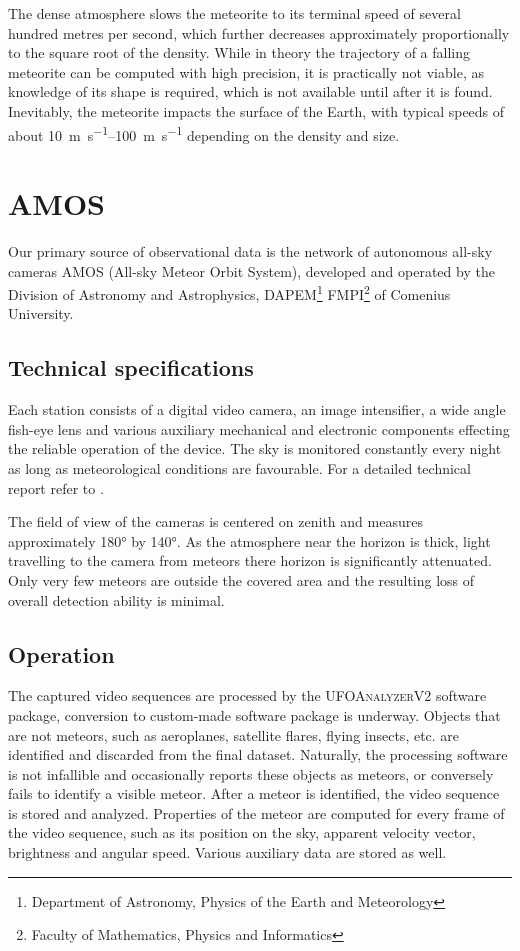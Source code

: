         The dense atmosphere slows the meteorite to its terminal speed of several hundred metres per second,
        which further decreases approximately proportionally to the square root of the density.
        While in theory the trajectory of a falling meteorite can be computed with high precision,
        it is practically not viable, as knowledge of its shape is required, which is not available
        until after it is found.
        Inevitably, the meteorite impacts the surface of the Earth,
        with typical speeds of about \SIrange{10}{100}{\metre\per\second} depending on the density and size.

\section{AMOS} \label{iA}
    Our primary source of observational data is the network of autonomous all-sky cameras AMOS (All-sky Meteor Orbit System),
    developed and operated by the Division of Astronomy and Astrophysics,
    DAPEM\footnote{Department of Astronomy, Physics of the Earth and Meteorology}
    FMPI\footnote{Faculty of Mathematics, Physics and Informatics} of Comenius University.

    \subsection{Technical specifications} \label{iAt}
        Each station consists of a digital video camera, an image intensifier, a wide angle fish-eye lens
        and various auxiliary mechanical and electronic components effecting
        the reliable operation of the device. The sky is monitored constantly every night
        as long as meteorological conditions are favourable. For a detailed technical report refer to \citet{zigo+2013,toth+2015}.

        The field of view of the cameras is centered on zenith and measures approximately \ang{180} by \ang{140}.
        As the atmosphere near the horizon is thick, light travelling to the camera from meteors there horizon is significantly attenuated.
        Only very few meteors are outside the covered area and the resulting loss of overall detection ability is minimal.

    \subsection{Operation} \label{iAo}
        The captured video sequences are processed by the \textsc{UFOAnalyzerV2} software package,
        conversion to custom-made software package is underway.
        Objects that are not meteors, such as aeroplanes, satellite flares, flying insects, etc.
        are identified and discarded from the final dataset. Naturally, the processing software is not
        infallible and occasionally reports these objects as meteors, or conversely fails to identify a visible meteor.
        After a meteor is identified, the video sequence is stored and analyzed.
        Properties of the meteor are computed for every frame of the video sequence,
        such as its position on the sky, apparent velocity vector, brightness and angular speed.
        Various auxiliary data are stored as well.

